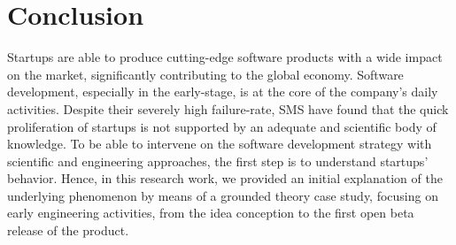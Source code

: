\documentclass[10pt,journal,letterpaper,compsoc]{IEEEtran}
\begin{document}
%





\section{Conclusion}
\label{conc}
Startups are able to produce cutting-edge software products with a wide impact 
on the market, significantly contributing to the global economy. Software 
development, especially in the early-stage, is at the core of the company's 
daily activities. Despite their severely high failure-rate, SMS \cite{SMS} have found that 
the quick proliferation of startups is not supported by an adequate and 
scientific body of knowledge. %
To be able to intervene on the software development strategy with scientific and 
engineering approaches, the first step is to understand startups' behavior. 
Hence, in this research work, we provided an initial explanation of the 
underlying phenomenon by means of a grounded theory case study, focusing on 
early engineering activities, from the idea conception to the first open beta 
release of the product.
\end{document}
